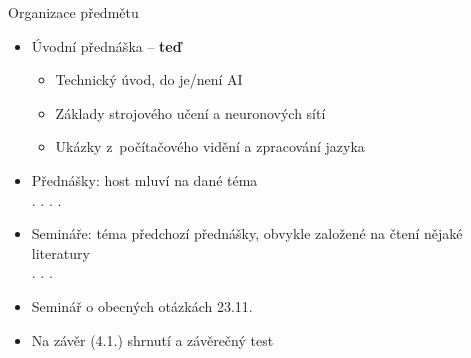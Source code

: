 \begin{frame}{Organizace předmětu}

    \begin{itemize}[<+->]

        \item Úvodní přednáška -- \textbf{teď}

        \begin{itemize}[<+->]

            \item Technický úvod, do je/není AI

            \item Základy strojového učení a neuronových sítí

            \item Ukázky z~počítačového vidění a zpracování jazyka

        \end{itemize}

        \item Přednášky: host mluví na dané téma \\
            . . . .


        \item Semináře: téma předchozí přednášky, obvykle založené na čtení
            nějaké literatury \\
             . . .

		\item Seminář o obecných otázkách 23.11.

        \item Na závěr (4.1.) shrnutí a závěrečný test

    \end{itemize}

    \vspace{10pt}

    \centering

\end{frame}


